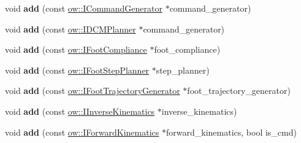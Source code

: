 \begin{DoxyCompactItemize}
\item 
void {\bfseries add} (const \hyperlink{classow_1_1ICommandGenerator}{ow\+::\+I\+Command\+Generator} $\ast$command\+\_\+generator)\hypertarget{classow__pub_1_1StatePublisher_adf06302a55fb1a98ed690c4ea0c4b834}{}\label{classow__pub_1_1StatePublisher_adf06302a55fb1a98ed690c4ea0c4b834}

\item 
void {\bfseries add} (const \hyperlink{classow_1_1IDCMPlanner}{ow\+::\+I\+D\+C\+M\+Planner} $\ast$command\+\_\+generator)\hypertarget{classow__pub_1_1StatePublisher_ab3342a67c1e5c9ed9054a1601555805c}{}\label{classow__pub_1_1StatePublisher_ab3342a67c1e5c9ed9054a1601555805c}

\item 
void {\bfseries add} (const \hyperlink{classow_1_1IFootCompliance}{ow\+::\+I\+Foot\+Compliance} $\ast$foot\+\_\+compliance)\hypertarget{classow__pub_1_1StatePublisher_a2594b1a36d04ad831f59215e3f11b887}{}\label{classow__pub_1_1StatePublisher_a2594b1a36d04ad831f59215e3f11b887}

\item 
void {\bfseries add} (const \hyperlink{classow_1_1IFootStepPlanner}{ow\+::\+I\+Foot\+Step\+Planner} $\ast$step\+\_\+planner)\hypertarget{classow__pub_1_1StatePublisher_a9ceeac4645a838c90b939fdfc02368d7}{}\label{classow__pub_1_1StatePublisher_a9ceeac4645a838c90b939fdfc02368d7}

\item 
void {\bfseries add} (const \hyperlink{classow_1_1IFootTrajectoryGenerator}{ow\+::\+I\+Foot\+Trajectory\+Generator} $\ast$foot\+\_\+trajectory\+\_\+generator)\hypertarget{classow__pub_1_1StatePublisher_abf5ccba9c948fe74d6065a4d80565e5d}{}\label{classow__pub_1_1StatePublisher_abf5ccba9c948fe74d6065a4d80565e5d}

\item 
void {\bfseries add} (const \hyperlink{classow_1_1IInverseKinematics}{ow\+::\+I\+Inverse\+Kinematics} $\ast$inverse\+\_\+kinematics)\hypertarget{classow__pub_1_1StatePublisher_aa10b1cf743a0ab4317ad8c1d2bc41c98}{}\label{classow__pub_1_1StatePublisher_aa10b1cf743a0ab4317ad8c1d2bc41c98}

\item 
void {\bfseries add} (const \hyperlink{classow_1_1IForwardKinematics}{ow\+::\+I\+Forward\+Kinematics} $\ast$forward\+\_\+kinematics, bool is\+\_\+cmd)\hypertarget{classow__pub_1_1StatePublisher_aa8150320d54c99af71a4982eaa349a9e}{}\label{classow__pub_1_1StatePublisher_aa8150320d54c99af71a4982eaa349a9e}


\end{DoxyCompactItemize}
